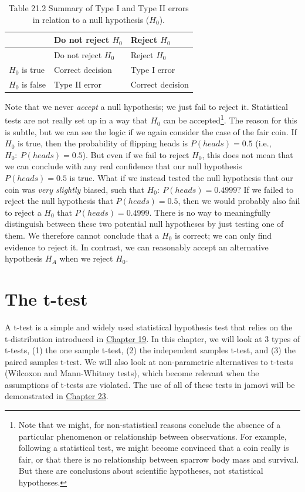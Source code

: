 \documentclass[
  openany]{scrbook}
\begin{document}
\begin{longtable}[]{@{}lll@{}}
\caption{Table 21.2 Summary of Type I and Type II errors in relation to a null hypothesis (\(H_{0}\)).}\tabularnewline
\toprule
& Do not reject \(H_{0}\) & Reject \(H_{0}\) \\
\midrule
\endfirsthead
\toprule
& Do not reject \(H_{0}\) & Reject \(H_{0}\) \\
\midrule
\endhead
\(H_{0}\) is true & Correct decision & Type I error \\
\(H_{0}\) is false & Type II error & Correct decision \\
\bottomrule
\end{longtable}

Note that we never \emph{accept} a null hypothesis; we just fail to reject it.
Statistical tests are not really set up in a way that \(H_{0}\) can be accepted\footnote{Note that we might, for non-statistical reasons conclude the absence of a particular phenomenon or relationship between observations. For example, following a statistical test, we might become convinced that a coin really is fair, or that there is no relationship between sparrow body mass and survival. But these are conclusions about scientific hypotheses, not statistical hypotheses.}.
The reason for this is subtle, but we can see the logic if we again consider the case of the fair coin.
If \(H_{0}\) is true, then the probability of flipping heads is \(P(heads) = 0.5\) (i.e., \(H_{0}:\:P(heads) = 0.5\)).
But even if we fail to reject \(H_{0}\), this does not mean that we can conclude with any real confidence that our null hypothesis \(P(heads) = 0.5\) is true.
What if we instead tested the null hypothesis that our coin was \emph{very slightly} biased, such that \(H_{0}:\:P(heads) = 0.4999\)?
If we failed to reject the null hypothesis that \(P(heads) = 0.5\), then we would probably also fail to reject a \(H_{0}\) that \(P(heads) = 0.4999\).
There is no way to meaningfully distinguish between these two potential null hypotheses by just testing one of them.
We therefore cannot conclude that a \(H_{0}\) is correct; we can only find evidence to reject it.
In contrast, we can reasonably accept an alternative hypothesis \(H_{A}\) when we reject \(H_{0}\).

\hypertarget{Chapter_22}{%
\chapter{The t-test}\label{Chapter_22}}

A t-test is a simple and widely used statistical hypothesis test that relies on the t-distribution introduced in \protect\hyperlink{Chapter_19}{Chapter 19}.
In this chapter, we will look at 3 types of t-tests, (1) the one sample t-test, (2) the independent samples t-test, and (3) the paired samples t-test.
We will also look at non-parametric alternatives to t-tests (Wilcoxon and Mann-Whitney tests), which become relevant when the assumptions of t-tests are violated.
The use of all of these tests in jamovi will be demonstrated in \protect\hyperlink{Chapter_23}{Chapter 23}.
\end{document}
